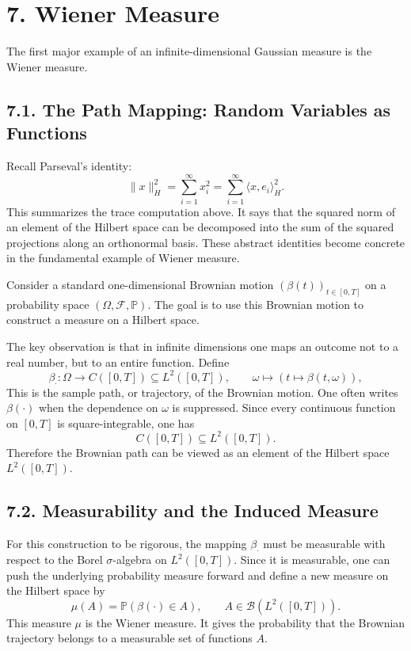 \documentclass[11pt]{article}
\theoremstyle{definition}
\theoremstyle{remark}
\begin{document}
\section*{7. Wiener Measure}
The first major example of an infinite-dimensional Gaussian measure is the Wiener measure.

\subsection*{7.1. The Path Mapping: Random Variables as Functions}
Recall Parseval's identity:
\[
\|x\|_H^2=\sum_{i=1}^{\infty}x_i^2=\sum_{i=1}^{\infty}\langle x,e_i\rangle_H^2.
\]
This summarizes the trace computation above. It says that the squared norm of an element of the Hilbert space can be decomposed into the sum of the squared projections along an orthonormal basis. These abstract identities become concrete in the fundamental example of Wiener measure.

Consider a standard one-dimensional Brownian motion $(\beta(t))_{t\in[0,T]}$ on a probability space $(\Omega,\mathcal F,\mathbb P)$. The goal is to use this Brownian motion to construct a measure on a Hilbert space.

The key observation is that in infinite dimensions one maps an outcome not to a real number, but to an entire function. Define
\[
\beta_{\cdot}:\Omega\to C([0,T])\subseteq L^2([0,T]),
\qquad
\omega\mapsto (t\mapsto \beta(t,\omega)),
\]
This is the sample path, or trajectory, of the Brownian motion. One often writes $\beta(\cdot)$ when the dependence on $\omega$ is suppressed. Since every continuous function on $[0,T]$ is square-integrable, one has
\[
C([0,T])\subseteq L^2([0,T]).
\]
Therefore the Brownian path can be viewed as an element of the Hilbert space $L^2([0,T])$.

\subsection*{7.2. Measurability and the Induced Measure}
For this construction to be rigorous, the mapping $\beta_{\cdot}$ must be measurable with respect to the Borel $\sigma$-algebra on $L^2([0,T])$. Since it is measurable, one can push the underlying probability measure forward and define a new measure on the Hilbert space by
\[
\mu(A)=\mathbb P(\beta(\cdot)\in A),
\qquad
A\in \mathcal B(L^2([0,T])).
\]
This measure $\mu$ is the Wiener measure. It gives the probability that the Brownian trajectory belongs to a measurable set of functions $A$.
\end{document}
